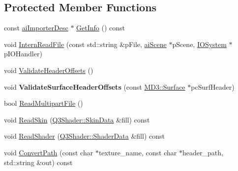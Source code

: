 \subsection*{Protected Member Functions}
\begin{DoxyCompactItemize}
\item 
const \hyperlink{structai_importer_desc}{ai\+Importer\+Desc} $\ast$ \hyperlink{class_assimp_1_1_m_d3_importer_ac10bd8b029d94b83024443515e10314e}{Get\+Info} () const 
\item 
void \hyperlink{class_assimp_1_1_m_d3_importer_af9055e49cde3548bb992a7666145ec10}{Intern\+Read\+File} (const std\+::string \&p\+File, \hyperlink{structai_scene}{ai\+Scene} $\ast$p\+Scene, \hyperlink{class_assimp_1_1_i_o_system}{I\+O\+System} $\ast$p\+I\+O\+Handler)
\item 
void \hyperlink{class_assimp_1_1_m_d3_importer_ab6a234993be5ad830c879f20a341f37e}{Validate\+Header\+Offsets} ()
\item 
\hypertarget{class_assimp_1_1_m_d3_importer_a334f511f8b68327577bb74a4387148b0}{void {\bfseries Validate\+Surface\+Header\+Offsets} (const \hyperlink{struct_assimp_1_1_m_d3_1_1_surface}{M\+D3\+::\+Surface} $\ast$pc\+Surf\+Header)}\label{class_assimp_1_1_m_d3_importer_a334f511f8b68327577bb74a4387148b0}

\item 
bool \hyperlink{class_assimp_1_1_m_d3_importer_a2770d933779371b033a1d9cc13e704c8}{Read\+Multipart\+File} ()
\item 
void \hyperlink{class_assimp_1_1_m_d3_importer_a0337f7ddc200310eb11c926d2a37bb82}{Read\+Skin} (\hyperlink{struct_assimp_1_1_q3_shader_1_1_skin_data}{Q3\+Shader\+::\+Skin\+Data} \&fill) const 
\item 
void \hyperlink{class_assimp_1_1_m_d3_importer_a7edc5bb96c177c509e6c9c3609aa9093}{Read\+Shader} (\hyperlink{struct_assimp_1_1_q3_shader_1_1_shader_data}{Q3\+Shader\+::\+Shader\+Data} \&fill) const 
\item 
void \hyperlink{class_assimp_1_1_m_d3_importer_a2e770a2bc48501614c6ec6ad97ea06e8}{Convert\+Path} (const char $\ast$texture\+\_\+name, const char $\ast$header\+\_\+path, std\+::string \&out) const 
\end{DoxyCompactItemize}
